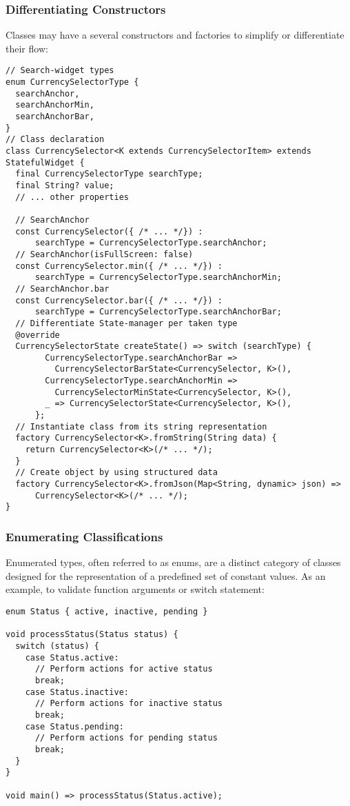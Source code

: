 \subsubsection{Differentiating Constructors}

Classes may have a several constructors and factories to simplify or differentiate their flow:

\begin{lstlisting}
// Search-widget types
enum CurrencySelectorType {
  searchAnchor,
  searchAnchorMin,
  searchAnchorBar,
}
// Class declaration
class CurrencySelector<K extends CurrencySelectorItem> extends StatefulWidget {
  final CurrencySelectorType searchType;
  final String? value;
  // ... other properties

  // SearchAnchor
  const CurrencySelector({ /* ... */}) : 
      searchType = CurrencySelectorType.searchAnchor;
  // SearchAnchor(isFullScreen: false)
  const CurrencySelector.min({ /* ... */}) : 
      searchType = CurrencySelectorType.searchAnchorMin;
  // SearchAnchor.bar
  const CurrencySelector.bar({ /* ... */}) : 
      searchType = CurrencySelectorType.searchAnchorBar;
  // Differentiate State-manager per taken type
  @override
  CurrencySelectorState createState() => switch (searchType) {
        CurrencySelectorType.searchAnchorBar =>
          CurrencySelectorBarState<CurrencySelector, K>(),
        CurrencySelectorType.searchAnchorMin =>
          CurrencySelectorMinState<CurrencySelector, K>(),
        _ => CurrencySelectorState<CurrencySelector, K>(),
      };
  // Instantiate class from its string representation 
  factory CurrencySelector<K>.fromString(String data) {
    return CurrencySelector<K>(/* ... */);
  }
  // Create object by using structured data
  factory CurrencySelector<K>.fromJson(Map<String, dynamic> json) =>
      CurrencySelector<K>(/* ... */);
}
\end{lstlisting}


\newpage
\subsubsection{Enumerating Classifications}

Enumerated types, often referred to as enums, are a distinct category of classes designed for the representation of a 
predefined set of constant values. As an example, to validate function arguments or switch statement:

\begin{lstlisting}
enum Status { active, inactive, pending }

void processStatus(Status status) {
  switch (status) {
    case Status.active:
      // Perform actions for active status
      break;
    case Status.inactive:
      // Perform actions for inactive status
      break;
    case Status.pending:
      // Perform actions for pending status
      break;
  }
}

void main() => processStatus(Status.active);
\end{lstlisting}

